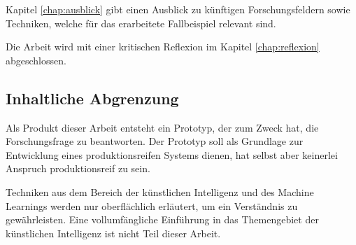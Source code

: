 Kapitel \ref{chap:ausblick} gibt einen Ausblick zu künftigen Forschungsfeldern sowie Techniken, welche für das erarbeitete Fallbeispiel relevant sind.

Die Arbeit wird mit einer kritischen Reflexion im Kapitel \ref{chap:reflexion} abgeschlossen.

\subsection{Inhaltliche Abgrenzung}

Als Produkt dieser Arbeit entsteht ein Prototyp, der zum Zweck hat, die Forschungsfrage zu beantworten. Der Prototyp soll als Grundlage zur Entwicklung eines produktionsreifen Systems dienen, hat selbst aber keinerlei Anspruch produktionsreif zu sein.

Techniken aus dem Bereich der künstlichen Intelligenz und des Machine Learnings werden nur oberflächlich erläutert, um ein Verständnis zu gewährleisten. Eine vollumfängliche Einführung in das Themengebiet der künstlichen Intelligenz ist nicht Teil dieser Arbeit.
